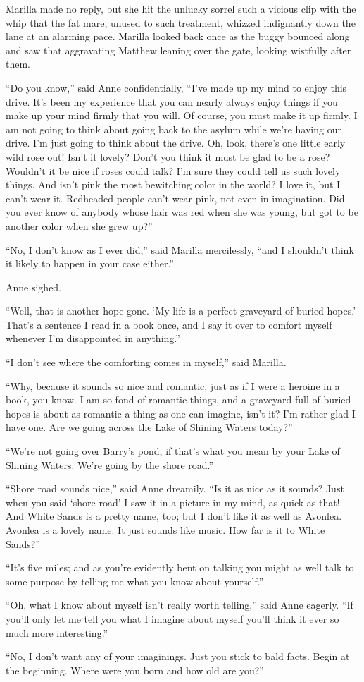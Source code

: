 \documentclass[a4paper]{article}
\begin{document}
\large{Marilla made no reply, but she hit the unlucky sorrel such a vicious clip with the whip that the fat mare, unused to such treatment, whizzed indignantly down the lane at an alarming pace. Marilla looked back once as the buggy bounced along and saw that aggravating Matthew leaning over the gate, looking wistfully after them.

``Do you know,'' said Anne confidentially, ``I've made up my mind to enjoy this drive. It's been my experience that you can nearly always enjoy things if you make up your mind firmly that you will. Of course, you must make it up firmly. I am not going to think about going back to the asylum while we're having our drive. I'm just going to think about the drive. Oh, look, there's one little early wild rose out! Isn't it lovely? Don't you think it must be glad to be a rose? Wouldn't it be nice if roses could talk? I'm sure they could tell us such lovely things. And isn't pink the most bewitching color in the world? I love it, but I can't wear it. Redheaded people can't wear pink, not even in imagination. Did you ever know of anybody whose hair was red when she was young, but got to be another color when she grew up?''

``No, I don't know as I ever did,'' said Marilla mercilessly, ``and I shouldn't think it likely to happen in your case either.''

Anne sighed.}

\Large{``Well, that is another hope gone. `My life is a perfect graveyard of buried hopes.' That's a sentence I read in a book once, and I say it over to comfort myself whenever I'm disappointed in anything.''

``I don't see where the comforting comes in myself,'' said Marilla.

``Why, because it sounds so nice and romantic, just as if I were a heroine in a book, you know. I am so fond of romantic things, and a graveyard full of buried hopes is about as romantic a thing as one can imagine, isn't it? I'm rather glad I have one. Are we going across the Lake of Shining Waters today?''

``We're not going over Barry's pond, if that's what you mean by your Lake of Shining Waters. We're going by the shore road.''}

\LARGE{``Shore road sounds nice,'' said Anne dreamily. ``Is it as nice as it sounds? Just when you said `shore road' I saw it in a picture in my mind, as quick as that! And White Sands is a pretty name, too; but I don't like it as well as Avonlea. Avonlea is a lovely name. It just sounds like music. How far is it to White Sands?''

``It's five miles; and as you're evidently bent on talking you might as well talk to some purpose by telling me what you know about yourself.''

``Oh, what I know about myself isn't really worth telling,'' said Anne eagerly. ``If you'll only let me tell you what I imagine about myself you'll think it ever so much more interesting.''

``No, I don't want any of your imaginings. Just you stick to bald facts. Begin at the beginning. Where were you born and how old are you?''}
\end{document}
